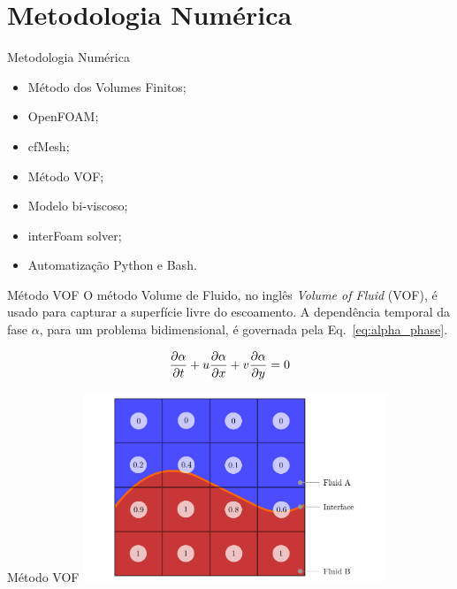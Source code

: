 \section{Metodologia Numérica}

\begin{frame}{Metodologia Numérica}
    \begin{itemize}
        \item Método dos Volumes Finitos; \pause
        \item OpenFOAM; \pause
        \item cfMesh; \pause
        \item Método VOF; \pause
        \item Modelo bi-viscoso; \pause
        \item interFoam solver; \pause
        \item Automatização Python e Bash.
    \end{itemize}
\end{frame}

\begin{frame}{Método VOF}
    O método Volume de Fluido, no inglês \textit{Volume of Fluid} (VOF), é usado para capturar a superfície livre do escoamento. A dependência temporal da fase $\alpha$, para um problema bidimensional, é governada pela Eq.~\ref{eq:alpha_phase}.

    \begin{equation} \label{eq:alpha_phase}
        \frac{\partial \alpha}{\partial t} + u \frac{\partial \alpha}{\partial x} + v \frac{\partial \alpha}{\partial y} = 0
    \end{equation}

\end{frame}

\begin{frame}{Método VOF} 
    \centering
    \includegraphics[width=0.68\textwidth]{images/vof.pdf}
\end{frame}


